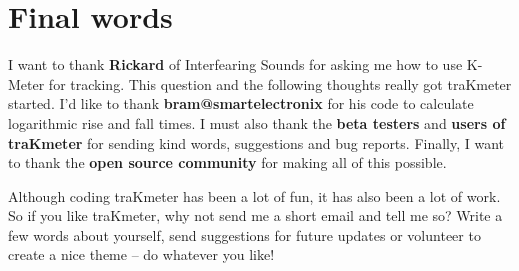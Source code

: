 







\chapter{Final words}
\label{chap:final_words}

I want to thank \textbf{Rickard} of Interfearing Sounds for asking me
how to use K-Meter for tracking.  This question and the following
thoughts really got traKmeter started.  I'd like to thank
\textbf{bram@smartelectronix} for his code to calculate logarithmic
rise and fall times.  I must also thank the \textbf{beta testers} and
\textbf{users of traKmeter} for sending kind words, suggestions and
bug reports.  Finally, I want to thank the \textbf{open source
  community} for making all of this possible.

Although coding traKmeter has been a lot of fun, it has also been a
lot of work.  So if you like traKmeter, why not send me a short email
and tell me so?  Write a few words about yourself, send suggestions
for future updates or volunteer to create a nice theme -- do whatever
you like!

